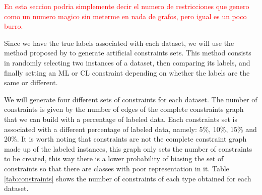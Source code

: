\documentclass[review]{elsarticle}
\begin{document}
\textcolor{red}{En esta seccion podria simplemente decir el numero de restricciones que genero como un numero magico sin meterme en nada de grafos, pero igual es un poco burro.}

Since we have the true labels associated with each dataset, we will use the method proposed by \cite{wagstaff2001constrained} to generate artificial constraints sets. This method consists in randomly selecting two instances of a dataset, then comparing its labels, and finally setting an ML or CL constraint depending on whether the labels are the same or different.

We will generate four different sets of constraints for each dataset. The number of constraints is given by the number of edges of the complete constraints graph that we can build with a percentage of labeled data. Each constraints set is associated with a different percentage of labeled data, namely: 5\%, 10\%, 15\% and 20\%. It is worth noting that constraints are not the complete constraint graph made up of the labeled instances, this graph only sets the number of constraints to be created, this way there is a lower probability of biasing the set of constraints so that there are classes with poor representation in it. Table \ref{tab:constraints} shows the number of constraints of each type obtained for each dataset.
\end{document}
